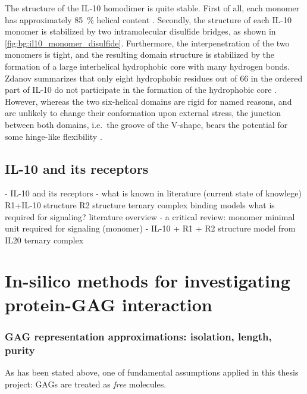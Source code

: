 The structure of the IL-10 homodimer is quite stable. First of all, each monomer
has approximately \SI{85}{\percent} helical content \cite{Zdanov1995}. Secondly,
the structure of each IL-10 monomer is stabilized by two intramolecular
disulfide bridges, as shown in \cref{fig:bg:il10_monomer_disulfide}.
Furthermore, the interpenetration of the two monomers is tight, and the
resulting domain structure is stabilized by the formation of a large
interhelical hydrophobic core with many hydrogen bonds. Zdanov summarizes that
only eight hydrophobic residues out of 66 in the ordered part of IL-10 do not
participate in the formation of the hydrophobic core \cite{Zdanov1995}. However,
whereas the two six-helical domains are rigid for named reasons, and are
unlikely to change their conformation upon external stress, the junction between
both domains, i.e.\ the groove of the V-shape, bears the potential for some
hinge-like flexibility \cite{Zdanov1995}.


\subsection{IL-10 and its receptors}

    - IL-10 and its receptors
        - what is known in literature (current state of knowlege)
            R1+IL-10 structure
            R2 structure
            ternary complex binding models
            what is required for signaling? literature overview
        - a critical review: monomer
            minimal unit required for signaling (monomer)
        - IL-10 + R1 + R2 structure model from IL20 ternary complex


\section{In-silico methods for investigating protein-GAG interaction}


\subsubsection{GAG representation approximations: isolation, length, purity}

As has been stated above, one of fundamental assumptions applied in this thesis
project: GAGs are treated as \textit{free} molecules.

